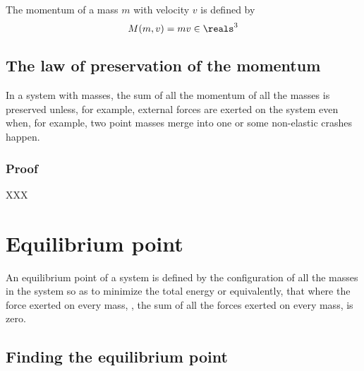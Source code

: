 \documentclass[12pt]{article}
\begin{document}
The momentum of a mass $m$ with velocity $v$ is defined by
\begin{equation}
M(m,v) = mv \in\reals^3
\end{equation}

\subsection{The law of preservation of the momentum}

In a system with masses,
the sum of all the momentum of all the masses
is preserved
unless, for example, external forces are exerted on the system
even when, for example, two point masses merge into one or some non-elastic crashes happen.


\subsubsection{Proof}

XXX

\section{Equilibrium point}

An equilibrium point of a system
is defined by the configuration of all the masses in the system
so as to minimize the total energy
or equivalently, 
that where the force exerted on every mass, \ie, the sum of all the forces exerted on every mass,
is zero.


\subsection{Finding the equilibrium point}
\end{document}

